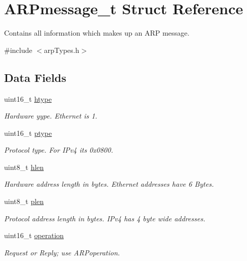 \hypertarget{struct_a_r_pmessage__t}{}\section{A\+R\+Pmessage\+\_\+t Struct Reference}
\label{struct_a_r_pmessage__t}


Contains all information which makes up an A\+RP message.  




{\ttfamily \#include $<$arp\+Types.\+h$>$}

\subsection*{Data Fields}
\begin{DoxyCompactItemize}
\item 
uint16\+\_\+t \mbox{\hyperlink{struct_a_r_pmessage__t_aaf87c38602b614bc7896cf7a5a90d372}{htype}}
\begin{DoxyCompactList}\small\item\em Hardware yype. Ethernet is 1. \end{DoxyCompactList}\item 
uint16\+\_\+t \mbox{\hyperlink{struct_a_r_pmessage__t_ab4891e9b77eb26f33d21cfde982564cb}{ptype}}
\begin{DoxyCompactList}\small\item\em Protocol type. For I\+Pv4 it\textquotesingle{}s 0x0800. \end{DoxyCompactList}\item 
uint8\+\_\+t \mbox{\hyperlink{struct_a_r_pmessage__t_aff25a69752648654e56c4ff3e0b1b226}{hlen}}
\begin{DoxyCompactList}\small\item\em Hardware address length in bytes. Ethernet addresses have 6 Bytes. \end{DoxyCompactList}\item 
uint8\+\_\+t \mbox{\hyperlink{struct_a_r_pmessage__t_ae414f6c2299d9cf0eff8aa8e81f538d8}{plen}}
\begin{DoxyCompactList}\small\item\em Protocol address length in bytes. I\+Pv4 has 4 byte wide addresses. \end{DoxyCompactList}\item 
uint16\+\_\+t \mbox{\hyperlink{struct_a_r_pmessage__t_ad21c763fa2f80cb8649108b759113b54}{operation}}
\begin{DoxyCompactList}\small\item\em Request or Reply; use A\+R\+Poperation. \end{DoxyCompactList}\item 

\end{DoxyCompactItemize}
